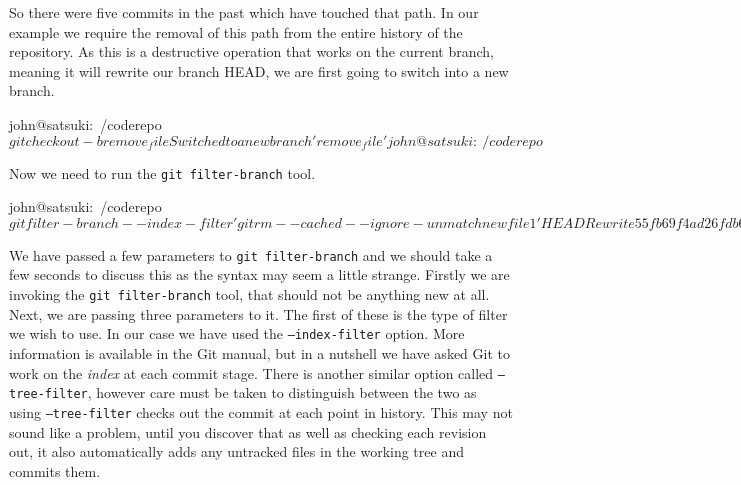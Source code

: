 So there were five commits in the past which have touched that path.
In our example we require the removal of this path from the entire history of the repository.
As this is a destructive operation that works on the current branch, meaning it will rewrite our branch HEAD, we are first going to switch into a new branch.

\begin{code}
john@satsuki:~/coderepo$ git checkout -b remove_file
Switched to a new branch 'remove_file'
john@satsuki:~/coderepo$ 
\end{code}

Now we need to run the \texttt{git filter-branch} tool.

\begin{code}
john@satsuki:~/coderepo$ git filter-branch --index-filter 'git rm --cached --ignore-unmatch newfile1' HEAD
Rewrite 55fb69f4ad26fdb6b90ac6f43431be40779962dd (6/21)rm 'newfile1'
Rewrite 9710177657ae00665ca8f8027b17314346a5b1c4 (7/21)rm 'newfile1'
Rewrite 4ac92012609cf8ed2480aa5d7f807caf2545fe2f (8/21)rm 'newfile1'
Rewrite cfbecabb031696a217b77b0e1285f2d5fc2ea2a3 (9/21)rm 'newfile1'
Rewrite b119573f4508514c55e1c4e3bebec0ab3667d071 (10/21)rm 'newfile1'
Rewrite ed2301ba223a63a5a930b536a043444e019460a7 (11/21)rm 'newfile1'
Rewrite a27d49ef11d9f0e66edbad8f6c7806510ad5b2be (12/21)rm 'newfile1'
Rewrite 7cc32dbf121f2afa8c40337db54bafb26de5b9c4 (13/21)rm 'newfile1'
Rewrite d50ffb2fa536d869f2c4e89e8d6a48e0a29c5cc1 (14/21)rm 'newfile1'
Rewrite 9cb2af2a00fd2253060e6bf8cc6c377b3d55ecea (15/21)rm 'newfile1'
Rewrite 37950f861a3cc0868c65ee9571fc6c491aa689ea (16/21)rm 'newfile1'
Rewrite 1c3206aac0fb012bfdaf5ff00e320b565bb89e7d (17/21)rm 'newfile1'
Rewrite 1968324ce2899883fca76bc25496bcf2b15e7011 (18/21)rm 'newfile1'
Rewrite f8d5100142b43ffaba9bbd539ba4fd92af79bf0e (19/21)rm 'newfile1'
Rewrite a8281fb589e36389cc8cb0da7ebee225b4d1adfc (20/21)rm 'newfile1'
Rewrite 30900fe1b7e72411dabab8b02070f36e2431f704 (21/21)rm 'newfile1'

Ref 'refs/heads/remove_file' was rewritten
john@satsuki:~/coderepo$
\end{code}

We have passed a few parameters to \texttt{git filter-branch} and we should take a few seconds to discuss this as the syntax may seem a little strange.
Firstly we are invoking the \texttt{git filter-branch} tool, that should not be anything new at all.
Next, we are passing three parameters to it.
The first of these is the type of filter we wish to use.
In our case we have used the \texttt{--index-filter} option.
More information is available in the Git manual, but in a nutshell we have asked Git to work on the \emph{index} at each commit stage.
There is another similar option called \texttt{--tree-filter}, however care must be taken to distinguish between the two as using \texttt{--tree-filter} checks out the commit at each point in history.
This may not sound like a problem, until you discover that as well as checking each revision out, it also automatically adds any untracked files in the working tree and commits them.

